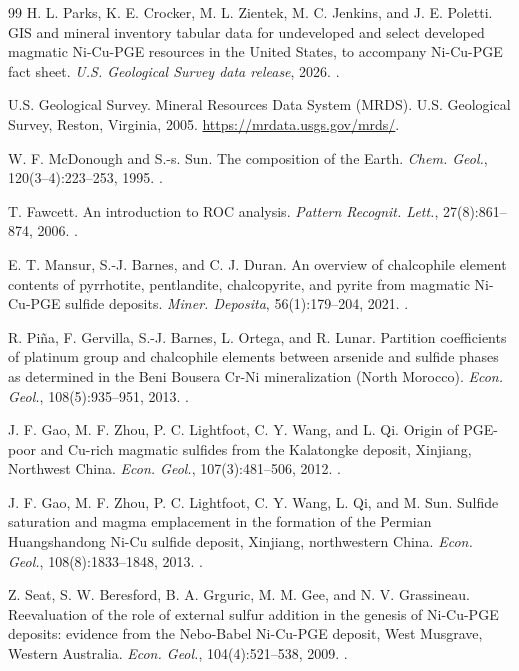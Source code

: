 \documentclass[10pt,twocolumn,letterpaper]{article}
\begin{document}
\begin{thebibliography}{99}
 H. L. Parks, K. E. Crocker, M. L. Zientek, M. C. Jenkins, and J. E. Poletti. GIS and mineral inventory tabular data for undeveloped and select developed magmatic Ni-Cu-PGE resources in the United States, to accompany Ni-Cu-PGE fact sheet. \textit{U.S. Geological Survey data release}, 2026. .

 U.S. Geological Survey. Mineral Resources Data System (MRDS). U.S. Geological Survey, Reston, Virginia, 2005. \url{https://mrdata.usgs.gov/mrds/}.

 W. F. McDonough and S.-s. Sun. The composition of the Earth. \textit{Chem. Geol.}, 120(3--4):223--253, 1995. .

 T. Fawcett. An introduction to ROC analysis. \textit{Pattern Recognit. Lett.}, 27(8):861--874, 2006. .

 E. T. Mansur, S.-J. Barnes, and C. J. Duran. An overview of chalcophile element contents of pyrrhotite, pentlandite, chalcopyrite, and pyrite from magmatic Ni-Cu-PGE sulfide deposits. \textit{Miner. Deposita}, 56(1):179--204, 2021. .

 R. Piña, F. Gervilla, S.-J. Barnes, L. Ortega, and R. Lunar. Partition coefficients of platinum group and chalcophile elements between arsenide and sulfide phases as determined in the Beni Bousera Cr-Ni mineralization (North Morocco). \textit{Econ. Geol.}, 108(5):935--951, 2013. .

 J. F. Gao, M. F. Zhou, P. C. Lightfoot, C. Y. Wang, and L. Qi. Origin of PGE-poor and Cu-rich magmatic sulfides from the Kalatongke deposit, Xinjiang, Northwest China. \textit{Econ. Geol.}, 107(3):481--506, 2012. .

 J. F. Gao, M. F. Zhou, P. C. Lightfoot, C. Y. Wang, L. Qi, and M. Sun. Sulfide saturation and magma emplacement in the formation of the Permian Huangshandong Ni-Cu sulfide deposit, Xinjiang, northwestern China. \textit{Econ. Geol.}, 108(8):1833--1848, 2013. .

 Z. Seat, S. W. Beresford, B. A. Grguric, M. M. Gee, and N. V. Grassineau. Reevaluation of the role of external sulfur addition in the genesis of Ni-Cu-PGE deposits: evidence from the Nebo-Babel Ni-Cu-PGE deposit, West Musgrave, Western Australia. \textit{Econ. Geol.}, 104(4):521--538, 2009. .


\end{thebibliography}
\end{document}
